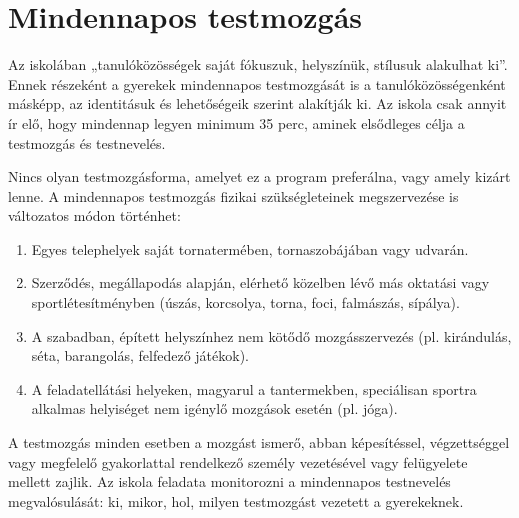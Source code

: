 \hypertarget{mindennapos-testmozgas}{%
\section{Mindennapos testmozgás}\label{mindennapos-testmozgas}}

Az iskolában „tanulóközösségek saját fókuszuk, helyszínük, stílusuk
alakulhat ki''. Ennek részeként a gyerekek mindennapos testmozgását is a
tanulóközösségenként másképp, az identitásuk és lehetőségeik szerint
alakítják ki. Az iskola csak annyit ír elő, hogy mindennap legyen
minimum 35 perc, aminek elsődleges célja a testmozgás és testnevelés.

Nincs olyan testmozgásforma, amelyet ez a program preferálna, vagy amely
kizárt lenne. A mindennapos testmozgás fizikai szükségleteinek
megszervezése is változatos módon történhet:

\begin{enumerate}
\def\labelenumi{\arabic{enumi}.}
\item
  Egyes telephelyek saját tornatermében, tornaszobájában vagy udvarán.
\item
  Szerződés, megállapodás alapján, elérhető közelben lévő más oktatási
  vagy sportlétesítményben (úszás, korcsolya, torna, foci, falmászás,
  sípálya).
\item
  A szabadban, épített helyszínhez nem kötődő mozgásszervezés (pl.
  kirándulás, séta, barangolás, felfedező játékok).
\item
  A feladatellátási helyeken, magyarul a tantermekben, speciálisan
  sportra alkalmas helyiséget nem igénylő mozgások esetén (pl. jóga).
\end{enumerate}

A testmozgás minden esetben a mozgást ismerő, abban képesítéssel,
végzettséggel vagy megfelelő gyakorlattal rendelkező személy vezetésével
vagy felügyelete mellett zajlik. Az iskola feladata monitorozni a
mindennapos testnevelés megvalósulását: ki, mikor, hol, milyen
testmozgást vezetett a gyerekeknek.
